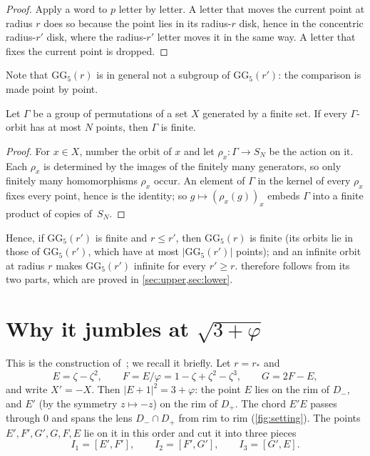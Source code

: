 \documentclass[11pt,a4paper]{article}
\newcommand{\GG}{\mathrm{GG}}
\newcommand{\rs}{r_{\ast}}
\begin{document}
\begin{proof}
Apply a word to $p$ letter by letter. A letter that moves the current point at radius $r$ does so
because the point lies in its radius-$r$ disk, hence in the concentric radius-$r'$ disk, where the
radius-$r'$ letter moves it in the same way. A letter that fixes the current point is dropped.
\end{proof}

Note that $\GG_5(r)$ is in general not a subgroup of $\GG_5(r')$: the comparison is made point by
point.

\begin{proposition}\label{prop:bounded}
Let $\Gamma$ be a group of permutations of a set $X$ generated by a finite set. If every
$\Gamma$-orbit has at most $N$ points, then $\Gamma$ is finite.
\end{proposition}

\begin{proof}
For $x\in X$, number the orbit of $x$ and let $\rho_x\colon \Gamma\to S_N$ be the action on it. Each
$\rho_x$ is determined by the images of the finitely many generators, so only finitely many
homomorphisms $\rho_x$ occur. An element of $\Gamma$ in the kernel of every $\rho_x$ fixes every
point, hence is the identity; so $g\mapsto(\rho_x(g))_x$ embeds $\Gamma$ into a finite product of
copies of~$S_N$.
\end{proof}

Hence, if $\GG_5(r')$ is finite and $r\le r'$, then $\GG_5(r)$ is finite (its orbits lie in those of
$\GG_5(r')$, which have at most $|\GG_5(r')|$ points); and an infinite orbit at radius $r$ makes
$\GG_5(r')$ infinite for every $r'\ge r$.  therefore follows from its two parts, which
are proved in \cref{sec:upper,sec:lower}.

\section{Why it jumbles at \texorpdfstring{$\sqrt{3+\varphi}$}{sqrt(3+phi)}}\label{sec:upper}

This is the construction of~\cite[Thm.~2]{hkrsv}; we recall it briefly. Let $r=\rs$ and
\[
  E=\zeta-\zeta^2,\qquad F=E/\varphi=1-\zeta+\zeta^2-\zeta^3,\qquad G=2F-E,
\]
and write $X'=-X$. Then $|E+1|^2=3+\varphi$: the point $E$ lies on the rim of $D_-$, and $E'$
(by the symmetry $z\mapsto-z$) on the rim of $D_+$. The chord $E'E$ passes through $0$ and spans the
lens $D_-\cap D_+$ from rim to rim (\cref{fig:setting}). The points
$E',F',G',G,F,E$ lie on it in this order and cut it into three pieces
\[
  I_1=[E',F'],\qquad I_2=[F',G'],\qquad I_3=[G',E].
\]
\end{document}
